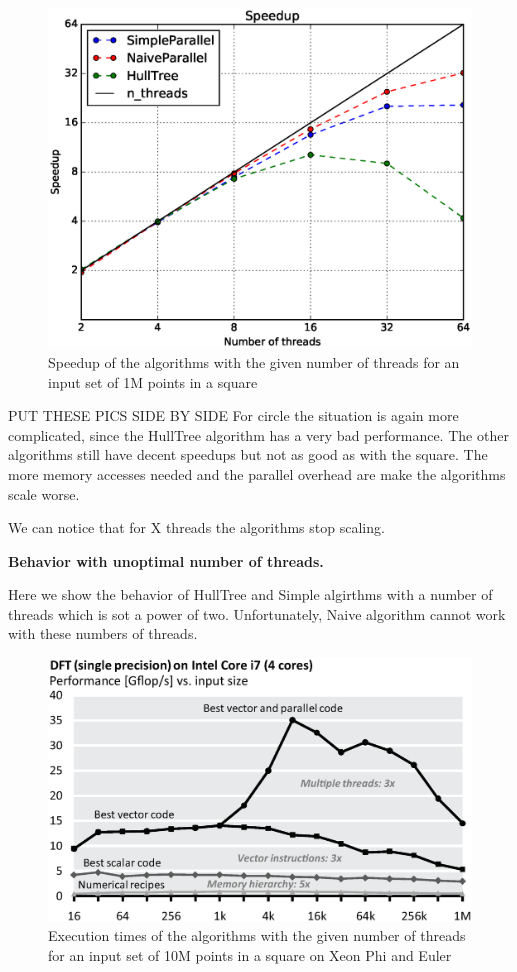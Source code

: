 \documentclass[letterpaper]{article}
\newcommand{\mypar}[1]{{\bf #1.}}
\begin{document}
\begin{figure}[!ht]\centering
  \includegraphics[scale=0.33]{./plots/speedup_xeon_square_1000000.eps}
  \caption{Speedup of the algorithms with the given number of threads for an input set of 1M points in a square\label{Threads time}}
\end{figure}

PUT THESE PICS SIDE BY SIDE
For circle the situation is again more complicated, since the HullTree algorithm has a very bad performance.
The other algorithms still have decent speedups but not as good as with the square.
The more memory accesses needed and the parallel overhead are make the algorithms scale worse.



We can notice that for X threads the algorithms stop scaling.

\mypar{Behavior with unoptimal number of threads}

Here we show the behavior of HullTree and Simple algirthms with a number of threads which is sot a power of two. Unfortunately, Naive algorithm cannot work with these numbers of threads.

\begin{figure}[!ht]\centering
  \includegraphics[scale=0.33]{dft-performance.eps}
  \caption{Execution times of the algorithms with the given number of threads for an input set of 10M points in a square on Xeon Phi and Euler\label{fftperf}}
\end{figure}
\end{document}
